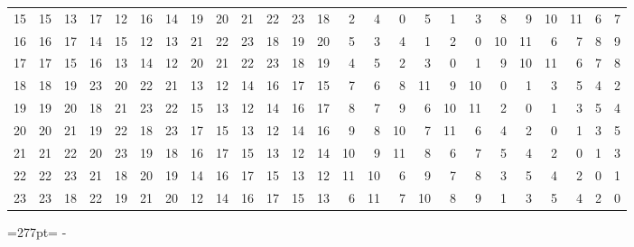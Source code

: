 \documentclass[10pt,a4paper]{article}
\newcommand{\needspace}[1]{\par\penalty-100\begingroup\dimen0=#1\relax\dimen2=\pagegoal
  \advance\dimen2-\pagetotal\ifdim\dimen0>\dimen2\relax\ifdim\dimen2>0pt\vfil\break\fi\fi
  \endgroup}
\numberwithin{equation}{section}
\begin{document}
{\begin{longtable}{@{}r|rrrrrrrrrrrrrrrrrrrrrrrr@{}}
15 & 15 & 13 & 17 & 12 & 16 & 14 & 19 & 20 & 21 & 22 & 23 & 18 & 2 & 4 & 0 & 5 & 1 & 3 & 8 & 9 & 10 & 11 & 6 & 7\\
16 & 16 & 17 & 14 & 15 & 12 & 13 & 21 & 22 & 23 & 18 & 19 & 20 & 5 & 3 & 4 & 1 & 2 & 0 & 10 & 11 & 6 & 7 & 8 & 9\\
17 & 17 & 15 & 16 & 13 & 14 & 12 & 20 & 21 & 22 & 23 & 18 & 19 & 4 & 5 & 2 & 3 & 0 & 1 & 9 & 10 & 11 & 6 & 7 & 8\\
18 & 18 & 19 & 23 & 20 & 22 & 21 & 13 & 12 & 14 & 16 & 17 & 15 & 7 & 6 & 8 & 11 & 9 & 10 & 0 & 1 & 3 & 5 & 4 & 2\\
19 & 19 & 20 & 18 & 21 & 23 & 22 & 15 & 13 & 12 & 14 & 16 & 17 & 8 & 7 & 9 & 6 & 10 & 11 & 2 & 0 & 1 & 3 & 5 & 4\\
20 & 20 & 21 & 19 & 22 & 18 & 23 & 17 & 15 & 13 & 12 & 14 & 16 & 9 & 8 & 10 & 7 & 11 & 6 & 4 & 2 & 0 & 1 & 3 & 5\\
21 & 21 & 22 & 20 & 23 & 19 & 18 & 16 & 17 & 15 & 13 & 12 & 14 & 10 & 9 & 11 & 8 & 6 & 7 & 5 & 4 & 2 & 0 & 1 & 3\\
22 & 22 & 23 & 21 & 18 & 20 & 19 & 14 & 16 & 17 & 15 & 13 & 12 & 11 & 10 & 6 & 9 & 7 & 8 & 3 & 5 & 4 & 2 & 0 & 1\\*
23 & 23 & 18 & 22 & 19 & 21 & 20 & 12 & 14 & 16 & 17 & 15 & 13 & 6 & 11 & 7 & 10 & 8 & 9 & 1 & 3 & 5 & 4 & 2 & 0\\
\bottomrule\end{longtable}}
\needspace{277pt}
\end{document}
